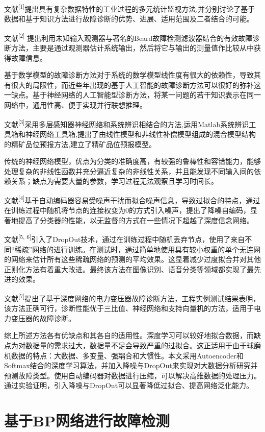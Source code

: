 \documentclass{ctacn}%
\begin{document}
\begin{multicols}{2}
文献\textsuperscript{[1]}提出具有复杂数据特性的工业过程的多元统计监视方法,并分别讨论了基于数据和基于知识方法进行故障诊断的优势、进展、适用范围及二者结合的可能。

文献\textsuperscript{[2]} 提出利用未知输入观测器与著名的Beard故障检测滤波器结合的有效故障诊断方法，主要是通过观测器估计系统输出，然后将它与输出的测量值作比较从中获得故障信息。

基于数学模型的故障诊断方法对于系统的数学模型线性度有很大的依赖性，导致其有很大的局限性，而近些年出现的基于人工智能的故障诊断方法可以很好的弥补这一缺点。基于神经网络的人工智能型诊断方法，将某一问题的若干知识表示在同一网络中，通用性高、便于实现并行联想推理。

文献\textsuperscript{[3]}采用多层感知器神经网络和系统辨识相结合的方法,运用Matlab系统辨识工具箱和神经网络工具箱,提出了由线性模型和非线性补偿模型组成的混合模型结构的精矿品位预报方法,建立了精矿品位预报模型。

传统的神经网络模型，优点为分类的准确度高，有较强的鲁棒性和容错能力，能够处理复杂的非线性函数并充分逼近复杂的非线性关系，并且能发现不同输入间的依赖关系；缺点为需要大量的参数，学习过程无法观察且学习时间长。

文献\textsuperscript{[4]}基于自动编码器容易受噪声干扰而拟合噪声信息，导致过拟合的特点，通过在训练过程中随机将节点的连接权变为0的方式引入噪声，提出了降噪自编码，显著地提高了分类器的性能，以无监督的方式在一些情况下超越了深度信念网络。

文献\textsuperscript{[5, 6]}引入了DropOut技术，通过在训练过程中随机丢弃节点，使用了来自不同“稀疏”网络的进行训练。在测试时，通过简单地使用具有较小权重的单个无连网的网络来估计所有这些稀疏网络的预测的平均效果。这显着减少过度拟合并对其他正则化方法有着重大改进。最终该方法在图像识别、语音分类等领域都实现了最先进的效果。

文献\textsuperscript{[7]}提出了基于深度网络的电力变压器故障诊断方法，工程实例测试结果表明，该方法正确可行，诊断性能优于三比值、神经网络和支持向量机的方法，适用于电力变压器的故障诊断。

综上所述方法各有优缺点和其各自的适用性。深度学习可以较好地拟合数据，而缺点为对数据量的需求过大，数据量不足会导致严重的过拟合。这正适用于由于球磨机数据的特点：大数据、多变量、强耦合和大惯性。本文采用Autoencoder和Softmax结合的深度学习算法，并加入降噪与DropOut来实现对大数据分析研究并预测故障类型。使用自动编码器对数据进行压缩，可以解决高维数据的处理压力。通过实验证明，引入降噪与DropOut可以显著降低过拟合、提高网络泛化能力。

\section{基于BP网络进行故障检测}


\end{multicols}
\end{document}
